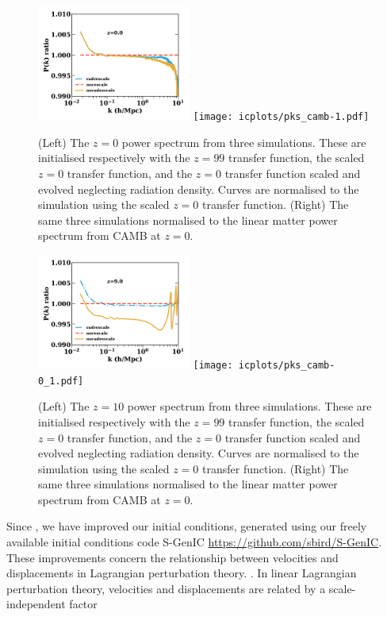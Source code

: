 \documentclass[useAMS, usenatbib]{mnras}
\begin{document}
\begin{figure}
\includegraphics[width=0.45\textwidth]{icplots/pks_rel-1.pdf}
\texttt{[image: icplots/pks\_camb-1.pdf]}
  \caption{(Left) The $z=0$ power spectrum from three simulations.
  These are initialised respectively with the $z=99$ transfer function,
  the scaled $z=0$ transfer function, and the $z=0$ transfer function
  scaled and evolved neglecting radiation density.
  Curves are normalised to the simulation using the scaled $z=0$ transfer function.
  (Right) The same three simulations normalised to the linear matter
  power spectrum from CAMB at $z=0$.}
  \label{fig:rescaling0}
\end{figure}

\begin{figure}
\includegraphics[width=0.45\textwidth]{icplots/pks_rel-0_1.pdf}
\texttt{[image: icplots/pks\_camb-0\_1.pdf]}
  \caption{(Left) The $z=10$ power spectrum from three simulations.
  These are initialised respectively with the $z=99$ transfer function,
  the scaled $z=0$ transfer function, and the $z=0$ transfer function
  scaled and evolved neglecting radiation density.
  Curves are normalised to the simulation using the scaled $z=0$ transfer function.
  (Right) The same three simulations normalised to the linear matter
  power spectrum from CAMB at $z=0$.}
  \label{fig:rescaling10}
\end{figure}


Since \cite{AHB}, we have improved our initial conditions, generated
using our freely available initial conditions code
S-GenIC \url{https://github.com/sbird/S-GenIC}. These improvements concern
the relationship between velocities and displacements in Lagrangian perturbation theory.
\citep{Zeldovich_1970, Scoccimarro_1998}. In linear Lagrangian perturbation theory,
velocities and displacements are related by a scale-independent factor
\end{document}
